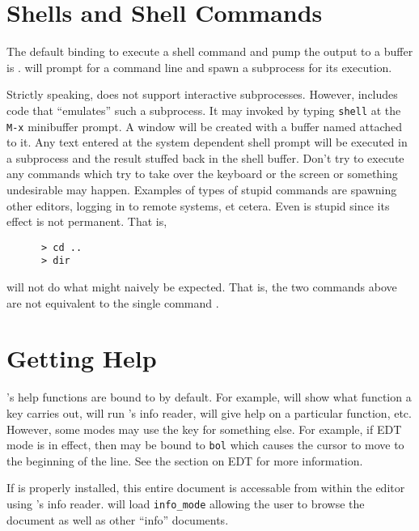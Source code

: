 \section{Shells and Shell Commands}

  The default binding to execute a shell command and pump the output to a
  buffer is .  \jed{} will prompt for a command line and spawn a
  subprocess for its execution.

  Strictly speaking, \jed{} does not support interactive subprocesses.
  However, \jed{} includes \slang{} code that ``emulates'' such a
  subprocess.  It may invoked by typing \verb|shell| at the \verb|M-x|
  minibuffer prompt.  A window will be created with a buffer named
   attached to it. Any text entered at the system dependent
  shell prompt will be executed in a subprocess and the result stuffed back
  in the shell buffer. Don't try to execute any commands which try to take
  over the keyboard or the screen or something undesirable may happen.
  Examples of types of stupid commands are spawning other editors, logging
  in to remote systems, et cetera.  Even  is stupid since its
  effect is not permanent.  That is,

\begin{verbatim}
      > cd ..
      > dir
\end{verbatim}


  will not do what might naively be expected.  That is, the two commands
  above are not equivalent to the single command .

\section{Getting Help}

  \jed{}'s help functions are bound to  by default.  For example,
   will show what function a key carries out,
   will run \jed{}'s info reader,  will give
  help on a particular \slang{} function, etc.  However, some modes may use
  the  key for something else.  For example, if EDT mode is in
  effect, then  may be bound to \verb|bol| which causes the
  cursor to move to the beginning of the line. See the section on EDT for
  more information.

  If \jed{} is properly installed, this entire document is accessable from
  within the editor using \jed{}'s info reader.   will load
  \verb|info_mode| allowing the user to browse the document as well as other
  ``info'' documents.

